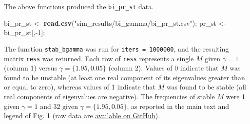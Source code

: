 \documentclass[]{article}
\newenvironment{Shaded}{\begin{snugshade}}{\end{snugshade}}
\newcommand{\KeywordTok}[1]{\textcolor[rgb]{0.13,0.29,0.53}{\textbf{{#1}}}}
\newcommand{\DecValTok}[1]{\textcolor[rgb]{0.00,0.00,0.81}{{#1}}}
\newcommand{\StringTok}[1]{\textcolor[rgb]{0.31,0.60,0.02}{{#1}}}
\newcommand{\NormalTok}[1]{{#1}}
\begin{document}
\begin{Shaded}
\end{Shaded}

The above functions produced the \texttt{bi\_pr\_st} data.

\begin{Shaded}
\begin{Highlighting}[]
\NormalTok{bi_pr_st <-}\StringTok{ }\KeywordTok{read.csv}\NormalTok{(}\StringTok{"sim_results/bi_gamma/bi_pr_st.csv"}\NormalTok{);}
\NormalTok{pr_st    <-}\StringTok{ }\NormalTok{bi_pr_st[,-}\DecValTok{1}\NormalTok{];}
\end{Highlighting}
\end{Shaded}

The function \texttt{stab\_bgamma} was run for
\texttt{iters\ =\ 1000000}, and the resulting matrix \texttt{ress} was
returned. Each row of \texttt{ress} represents a single \(M\) given
\(\gamma = 1\) (column 1) versus \(\gamma = \{1.95, 0.05\}\) (column 2).
Values of 0 indicate that \(M\) was found to be unstable (at least one
real component of its eigenvalues greater than or equal to zero),
whereas values of 1 indicate that \(M\) was found to be stable (all real
components of eigenvalues are negative). The frequencies of stable \(M\)
were 1 given \(\gamma = 1\) and 32 given \(\gamma = \{1.95, 0.05\}\), as
reported in the main text and legend of Fig. 1 (raw data are
\href{https://github.com/bradduthie/RandomMatrixStability/blob/master/sim_results/bi_gamma/bi_pr_st.csv}{available
on GitHub}).
\end{document}
